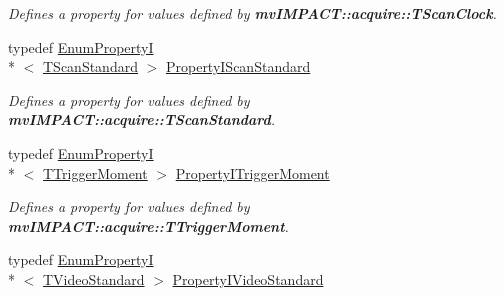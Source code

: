 \begin{DoxyCompactItemize}
\begin{DoxyCompactList}\small\item\em Defines a property for values defined by {\bfseries mv\+I\+M\+P\+A\+C\+T\+::acquire\+::\+T\+Scan\+Clock}. \end{DoxyCompactList}\item 
\hypertarget{group___device_specific_interface_gabc31d508d02db97ff522a1285a450f04}{typedef \hyperlink{classmv_i_m_p_a_c_t_1_1acquire_1_1_enum_property_i}{Enum\+Property\+I}\\*
$<$ \hyperlink{group___device_specific_interface_ga7a78489f39d4e77dd06dd7cee5c40de0}{T\+Scan\+Standard} $>$ \hyperlink{group___device_specific_interface_gabc31d508d02db97ff522a1285a450f04}{Property\+I\+Scan\+Standard}}\label{group___device_specific_interface_gabc31d508d02db97ff522a1285a450f04}

\begin{DoxyCompactList}\small\item\em Defines a property for values defined by {\bfseries mv\+I\+M\+P\+A\+C\+T\+::acquire\+::\+T\+Scan\+Standard}. \end{DoxyCompactList}\item 
\hypertarget{group___device_specific_interface_gaa261dc5ec8f6c2053d6e5a1485ac101d}{typedef \hyperlink{classmv_i_m_p_a_c_t_1_1acquire_1_1_enum_property_i}{Enum\+Property\+I}\\*
$<$ \hyperlink{group___device_specific_interface_gaecea4d916e389bf03470e46d3c8e1851}{T\+Trigger\+Moment} $>$ \hyperlink{group___device_specific_interface_gaa261dc5ec8f6c2053d6e5a1485ac101d}{Property\+I\+Trigger\+Moment}}\label{group___device_specific_interface_gaa261dc5ec8f6c2053d6e5a1485ac101d}

\begin{DoxyCompactList}\small\item\em Defines a property for values defined by {\bfseries mv\+I\+M\+P\+A\+C\+T\+::acquire\+::\+T\+Trigger\+Moment}. \end{DoxyCompactList}\item 
\hypertarget{group___device_specific_interface_ga8b964e42762ee1cba12e1b4bd9c9f114}{typedef \hyperlink{classmv_i_m_p_a_c_t_1_1acquire_1_1_enum_property_i}{Enum\+Property\+I}\\*
$<$ \hyperlink{group___common_interface_gafd55ecc3208ea4000a6d2517894a280f}{T\+Video\+Standard} $>$ \hyperlink{group___device_specific_interface_ga8b964e42762ee1cba12e1b4bd9c9f114}{Property\+I\+Video\+Standard}}\label{group___device_specific_interface_ga8b964e42762ee1cba12e1b4bd9c9f114}


\end{DoxyCompactItemize}
